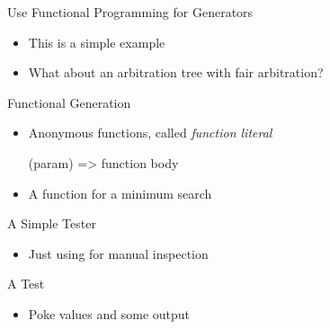 \begin{frame}[fragile]{Use Functional Programming for Generators}
\begin{itemize}
\item This is a simple example
\item What about an arbitration tree with fair arbitration?
\end{itemize}
\end{frame}

\begin{frame}[fragile]{Functional Generation}
\begin{itemize}
\item Anonymous functions, called \emph{function literal}
\begin{chisel}
  (param) => function body
\end{chisel}
\item A function for a minimum search
\end{itemize}
\end{frame}




\begin{frame}[fragile]{A Simple Tester}
\begin{itemize}
\item Just using  for manual inspection
\end{itemize}
\end{frame}


\begin{frame}[fragile]{A Test}
\begin{itemize}
\item Poke values and  some output
\end{itemize}
\end{frame}

%


